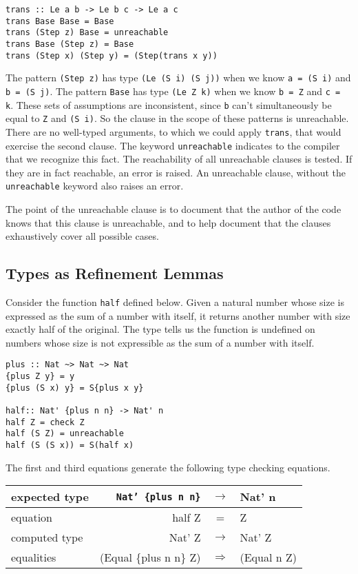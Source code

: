\documentclass[11pt,twoside]{article}
\newcommand{\plus}[2]{\{plus {#1} {#2}\}}
\begin{document}
\begin{verbatim}
trans :: Le a b -> Le b c -> Le a c
trans Base Base = Base
trans (Step z) Base = unreachable
trans Base (Step z) = Base
trans (Step x) (Step y) = (Step(trans x y))
\end{verbatim}
The pattern \verb+(Step z)+ has type \verb+(Le (S i) (S j))+
when we know \verb+a = (S i)+ and \verb+b = (S j)+.
The pattern \verb+Base+ has type \verb+(Le Z k)+ when we
know \verb+b = Z+ and \verb+c = k+. These sets of assumptions
are inconsistent, since \verb+b+ can't simultaneously
be equal to \verb+Z+ and \verb+(S i)+. So the clause in the
scope of these patterns is unreachable. There are no well-typed
arguments, to which we could apply {\tt trans}, that would
exercise the second clause. The keyword {\tt unreachable}
indicates to the compiler that we recognize this fact.
The reachability of all unreachable clauses is tested.
If they are in fact reachable, an error is raised. An
unreachable clause, without the {\tt unreachable} keyword
also raises an error.

The point of the unreachable clause is to document that the
author of the code knows that this clause is unreachable, and to
help document that the clauses exhaustively cover all
possible cases.


\subsection{Types as Refinement Lemmas} \label{refine}

Consider the function {\tt half} defined below. Given a natural
number whose size is expressed as the sum of a number with itself,
it returns another number with size exactly half of the original. The
type tells us the function is undefined on numbers whose
size is not expressible as the sum of a number with itself.

\begin{verbatim}
plus :: Nat ~> Nat ~> Nat
{plus Z y} = y
{plus (S x) y} = S{plus x y}

half:: Nat' {plus n n} -> Nat' n
half Z = check Z
half (S Z) = unreachable
half (S (S x)) = S(half x)
\end{verbatim}

\noindent
The first and third equations generate the following type checking equations.

\vspace*{.1in}
\begin{tabular}{|l|rcl|} \hline
{\small expected type} & {\small{\tt Nat' \plus{n}{n}}} & $\rightarrow$ & {\small Nat' n} \\ \hline
{\small equation} & {\small half Z} & =             & {\small Z} \\ \hline
{\small computed type} & {\small Nat' Z} & $\rightarrow$ & {\small Nat' Z} \\ \hline
{\small equalities}    & {\small (Equal \plus{n}{n} Z)} & $\Rightarrow$ & {\small (Equal n Z)} \\ \hline
\end{tabular}
\vspace*{.1in}
\end{document}
